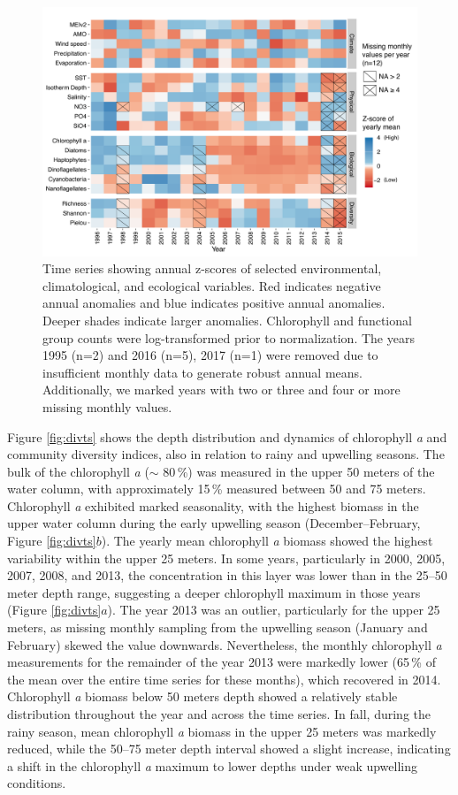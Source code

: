 \documentclass[draft]{agujournal2019}
\begin{document}
    
    \begin{figure}
    \noindent\includegraphics[width=\textwidth]{fig/Figure2_ZScores_v2.pdf}
    \caption{Time series showing annual z-scores of selected environmental, climatological, and ecological variables. Red indicates negative annual anomalies and blue indicates positive annual anomalies. Deeper shades indicate larger anomalies. Chlorophyll and functional group counts were log-transformed prior to normalization. The years 1995 (n=2) and 2016 (n=5), 2017 (n=1) were removed due to insufficient monthly data to generate robust annual means. Additionally, we marked years with two or three and four or more missing monthly values.}
    \label{fig:zscore}
    \end{figure}
    
    Figure \ref{fig:divts} shows the depth distribution and dynamics of chlorophyll \textit{a} and community diversity indices, also in relation to rainy and upwelling seasons. The bulk of the chlorophyll \textit{a} ($\sim$ 80\,\%) was measured in the upper 50 meters of the water column, with approximately 15\,\% measured between 50 and 75 meters. Chlorophyll \textit{a} exhibited marked seasonality, with the highest biomass in the upper water column during the early upwelling season (December–February, Figure \ref{fig:divts}$b$). The yearly mean chlorophyll \textit{a} biomass showed the highest variability within the upper 25 meters. In some years, particularly in 2000, 2005, 2007, 2008, and 2013, the concentration in this layer was lower than in the 25–50 meter depth range, suggesting a deeper chlorophyll maximum in those years (Figure \ref{fig:divts}$a$). The year 2013 was an outlier, particularly for the upper 25 meters, as missing monthly sampling from the upwelling season (January and February) skewed the value downwards. Nevertheless, the monthly chlorophyll \textit{a} measurements for the remainder of the year 2013 were markedly lower (65\,\% of the mean over the entire time series for these months), which recovered in 2014. Chlorophyll \textit{a} biomass below 50 meters depth showed a relatively stable distribution throughout the year and across the time series. In fall, during the rainy season, mean chlorophyll \textit{a} biomass in the upper 25 meters was markedly reduced, while the 50–75 meter depth interval showed a slight increase, indicating a shift in the chlorophyll \textit{a} maximum to lower depths under weak upwelling conditions.
    
\end{document}
